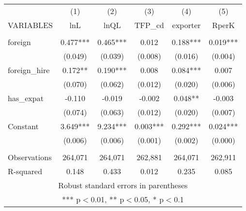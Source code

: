 \begin{tabular}{lccccc} \hline
 & (1) & (2) & (3) & (4) & (5) \\
VARIABLES & lnL & lnQL & TFP\_cd & exporter & RperK \\ \hline
 &  &  &  &  &  \\
foreign & 0.477*** & 0.465*** & 0.012 & 0.188*** & 0.019*** \\
 & (0.049) & (0.039) & (0.008) & (0.016) & (0.004) \\
foreign\_hire & 0.172** & 0.190*** & 0.008 & 0.084*** & 0.007 \\
 & (0.070) & (0.062) & (0.012) & (0.020) & (0.006) \\
has\_expat & -0.110 & -0.019 & -0.002 & 0.048** & -0.003 \\
 & (0.074) & (0.063) & (0.012) & (0.020) & (0.007) \\
Constant & 3.649*** & 9.234*** & 0.003*** & 0.292*** & 0.024*** \\
 & (0.006) & (0.006) & (0.001) & (0.002) & (0.000) \\
 &  &  &  &  &  \\
Observations & 264,071 & 264,071 & 262,881 & 264,071 & 262,911 \\
 R-squared & 0.148 & 0.433 & 0.012 & 0.235 & 0.085 \\ \hline
\multicolumn{6}{c}{ Robust standard errors in parentheses} \\
\multicolumn{6}{c}{ *** p$<$0.01, ** p$<$0.05, * p$<$0.1} \\
\end{tabular}
